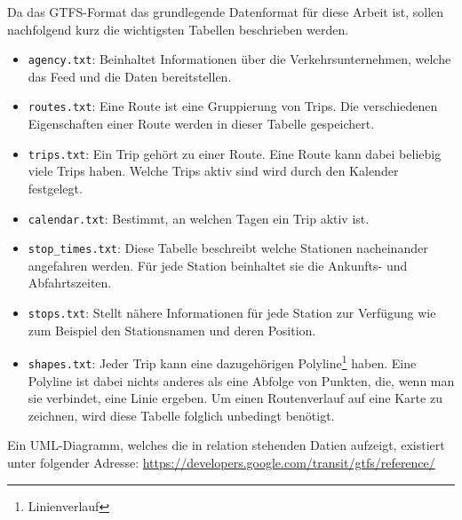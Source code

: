 \begin{newpage}
		Da das GTFS-Format das grundlegende Datenformat für diese Arbeit ist, sollen nachfolgend kurz die wichtigsten Tabellen beschrieben werden.

		\begin{itemize}
			\item \texttt{agency.txt}: Beinhaltet Informationen über die Verkehrsunternehmen, welche das Feed und die Daten bereitstellen.

			\item \texttt{routes.txt}: Eine Route ist eine Gruppierung von Trips. Die verschiedenen Eigenschaften einer Route werden in dieser Tabelle gespeichert.

			\item \texttt{trips.txt}: Ein Trip gehört zu einer Route. Eine Route kann dabei beliebig viele Trips haben. Welche Trips aktiv sind wird durch den Kalender festgelegt.

			\item \texttt{calendar.txt}: Bestimmt, an welchen Tagen ein Trip aktiv ist.

			\item \texttt{stop\_times.txt}: Diese Tabelle beschreibt welche Stationen nacheinander angefahren werden. Für jede Station beinhaltet sie die Ankunfts- und Abfahrtszeiten.

			\item \texttt{stops.txt}: Stellt nähere Informationen für jede Station zur Verfügung wie zum Beispiel den Stationsnamen und deren Position.

			\item \texttt{shapes.txt}: Jeder Trip kann eine dazugehörigen Polyline\footnote{Linienverlauf} haben. Eine Polyline ist dabei nichts anderes als eine Abfolge von Punkten, die, wenn man sie verbindet, eine Linie ergeben. Um einen Routenverlauf auf eine Karte zu zeichnen, wird diese Tabelle folglich unbedingt benötigt. 
		\end{itemize}

  Ein UML-Diagramm, welches die in relation stehenden Datien aufzeigt, existiert unter folgender Adresse: \url{https://developers.google.com/transit/gtfs/reference/} 

\end{newpage}
